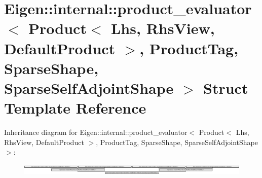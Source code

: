 \hypertarget{struct_eigen_1_1internal_1_1product__evaluator_3_01_product_3_01_lhs_00_01_rhs_view_00_01_defaule3daa34d3e750fc1a34e5c28fcdbf893}{}\section{Eigen\+:\+:internal\+:\+:product\+\_\+evaluator$<$ Product$<$ Lhs, Rhs\+View, Default\+Product $>$, Product\+Tag, Sparse\+Shape, Sparse\+Self\+Adjoint\+Shape $>$ Struct Template Reference}
\label{struct_eigen_1_1internal_1_1product__evaluator_3_01_product_3_01_lhs_00_01_rhs_view_00_01_defaule3daa34d3e750fc1a34e5c28fcdbf893}
Inheritance diagram for Eigen\+:\+:internal\+:\+:product\+\_\+evaluator$<$ Product$<$ Lhs, Rhs\+View, Default\+Product $>$, Product\+Tag, Sparse\+Shape, Sparse\+Self\+Adjoint\+Shape $>$\+:\begin{figure}[H]
\begin{center}
\leavevmode
\includegraphics[height=0.540541cm]{struct_eigen_1_1internal_1_1product__evaluator_3_01_product_3_01_lhs_00_01_rhs_view_00_01_defaule3daa34d3e750fc1a34e5c28fcdbf893}
\end{center}
\end{figure}
